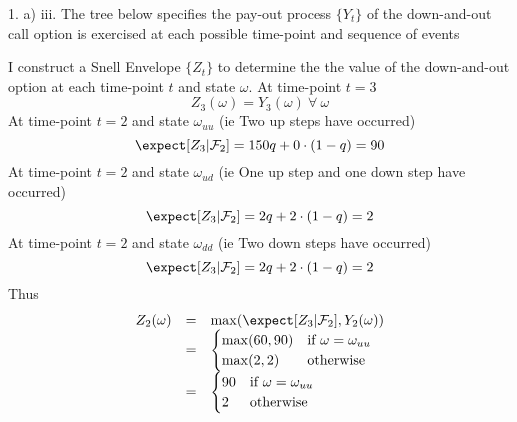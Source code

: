 \documentclass[11pt,a4paper]{article}
\begin{document}
\begin{answer}{1. a) iii.}
  The tree below specifies the pay-out process $\{Y_t\}$ of the down-and-out call option is exercised at each possible time-point and sequence of events
  \begin{center}
  \end{center}
  I construct a Snell Envelope $\{Z_t\}$ to determine the the value of the down-and-out option at each time-point $t$ and state $\omega$.
  At time-point $t=3$
  \[ Z_3(\omega)=Y_3(\omega)\ \forall\ \omega \]
  At time-point $t=2$ and state $\omega_{uu}$ (ie Two up steps have occurred)
  \[ \expect[Z_3|\mathcal{F}_2]=150q+0\cdot(1-q)=90 \]
  At time-point $t=2$ and state $\omega_{ud}$ (ie One up step and one down step have occurred)
  \[ \expect[Z_3|\mathcal{F}_2]=2q+2\cdot(1-q)=2 \]
  At time-point $t=2$ and state $\omega_{dd}$ (ie Two down steps have occurred)
  \[ \expect[Z_3|\mathcal{F}_2]=2q+2\cdot(1-q)=2 \]
  Thus
  \[\begin{array}{rcl}
    Z_2(\omega)&=&\max(\expect[Z_3|\mathcal{F}_2],Y_2(\omega))\\
    &=&\begin{cases}
      \max(60,90)&\text{if }\omega=\omega_{uu}\\
      \max(2,2)&\text{otherwise}\\
    \end{cases}\\
    &=&\begin{cases}
      90&\text{if }\omega=\omega_{uu}\\
      2&\text{otherwise}\\
    \end{cases}
  \end{array}\]

\end{answer}
\end{document}
